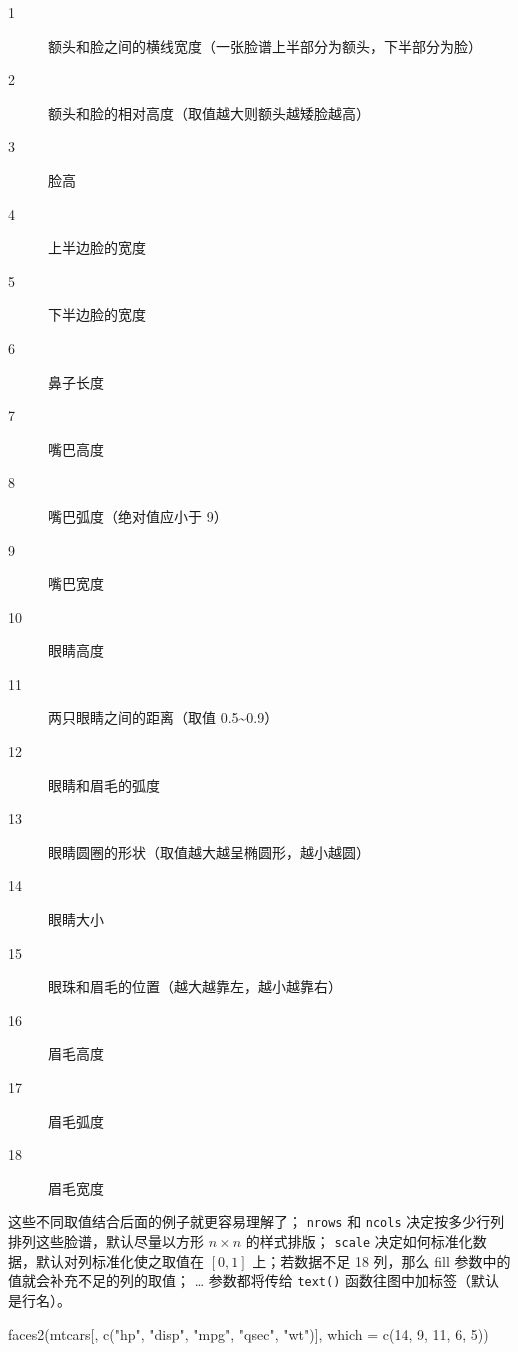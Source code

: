 \documentclass[
  b5paper,
  UTF8,twoside]{book}
\newenvironment{Shaded}{\begin{snugshade}}{\end{snugshade}}
\newcommand{\AttributeTok}[1]{\textcolor[rgb]{0.77,0.63,0.00}{#1}}
\newcommand{\DecValTok}[1]{\textcolor[rgb]{0.00,0.00,0.81}{#1}}
\newcommand{\FunctionTok}[1]{\textcolor[rgb]{0.00,0.00,0.00}{#1}}
\newcommand{\NormalTok}[1]{#1}
\newcommand{\StringTok}[1]{\textcolor[rgb]{0.31,0.60,0.02}{#1}}
\begin{document}
\begin{description}
\item[1]
额头和脸之间的横线宽度（一张脸谱上半部分为额头，下半部分为脸）
\item[2]
额头和脸的相对高度（取值越大则额头越矮脸越高）
\item[3]
脸高
\item[4]
上半边脸的宽度
\item[5]
下半边脸的宽度
\item[6]
鼻子长度
\item[7]
嘴巴高度
\item[8]
嘴巴弧度（绝对值应小于 9）
\item[9]
嘴巴宽度
\item[10]
眼睛高度
\item[11]
两只眼睛之间的距离（取值 0.5\textasciitilde0.9）
\item[12]
眼睛和眉毛的弧度
\item[13]
眼睛圆圈的形状（取值越大越呈椭圆形，越小越圆）
\item[14]
眼睛大小
\item[15]
眼珠和眉毛的位置（越大越靠左，越小越靠右）
\item[16]
眉毛高度
\item[17]
眉毛弧度
\item[18]
眉毛宽度
\end{description}

这些不同取值结合后面的例子就更容易理解了； \texttt{nrows} 和 \texttt{ncols} 决定按多少行列排列这些脸谱，默认尽量以方形 \(n\times n\) 的样式排版； \texttt{scale} 决定如何标准化数据，默认对列标准化使之取值在 \([0, 1]\) 上；若数据不足 18 列，那么 fill 参数中的值就会补充不足的列的取值； \ldots{} 参数都将传给 \texttt{text()} 函数往图中加标签（默认是行名）。





\begin{Shaded}
\begin{Highlighting}[]
\FunctionTok{faces2}\NormalTok{(mtcars[, }\FunctionTok{c}\NormalTok{(}\StringTok{"hp"}\NormalTok{, }\StringTok{"disp"}\NormalTok{, }\StringTok{"mpg"}\NormalTok{, }\StringTok{"qsec"}\NormalTok{, }\StringTok{"wt"}\NormalTok{)], }\AttributeTok{which =} \FunctionTok{c}\NormalTok{(}\DecValTok{14}\NormalTok{, }\DecValTok{9}\NormalTok{, }\DecValTok{11}\NormalTok{, }\DecValTok{6}\NormalTok{, }\DecValTok{5}\NormalTok{))}
\end{Highlighting}
\end{Shaded}
\end{document}
